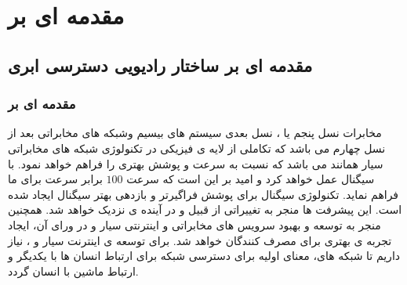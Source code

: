\chapter{مقدمه ای بر }

\section{  مقدمه ای بر ساختار رادیویی دسترسی ابری}

\subsection{مقدمه ای بر  }


مخابرات نسل پنجم یا ، نسل بعدی سیستم های بیسیم  وشبکه های مخابراتی بعد از نسل چهارم می باشد که تکاملی از لایه ی فیزیکی در تکنولوژی شبکه های مخابراتی سیار همانند  می باشد که نسبت به  سرعت و پوشش بهتری را فراهم خواهد نمود.   با سیگنال   عمل خواهد کرد و امید بر این است که سرعت $100$ برابر سرعت   برای ما فراهم نماید.\newline
تکنولوژی سیگنال   برای پوشش فراگیرتر و بازدهی بهتر سیگنال ایجاد شده است. این پیشرفت ها منجر به تغییراتی از قبیل  و  در آینده ی نزدیک خواهد شد.
همچنین  منجر به توسعه و بهبود سرویس های مخابراتی و اینترنتی سیار و در ورای آن، ایجاد تجربه ی بهتری برای مصرف کنندگان خواهد شد.\newline
برای توسعه ی اینترنت سیار و ، نیاز داریم تا شبکه های، معنای اولیه برای دسترسی شبکه برای ارتباط انسان ها با یکدیگر و ارتباط ماشین با انسان گردد.
